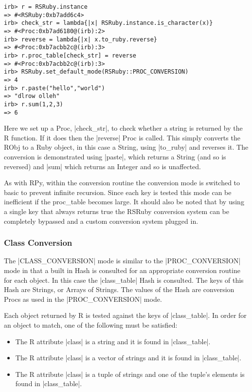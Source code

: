 \documentclass[a4paper,12pt]{book}
\begin{document}
\begin{Verbatim}
irb> r = RSRuby.instance
=> #<RSRuby:0xb7add6c4>
irb> check_str = lambda{|x| RSRuby.instance.is_character(x)}
=> #<Proc:0xb7ad6180@(irb):2>
irb> reverse = lambda{|x| x.to_ruby.reverse}
=> #<Proc:0xb7acbb2c@(irb):3>
irb> r.proc_table[check_str] = reverse
=> #<Proc:0xb7acbb2c@(irb):3>
irb> RSRuby.set_default_mode(RSRuby::PROC_CONVERSION)
=> 4
irb> r.paste("hello","world")
=> "dlrow olleh"
irb> r.sum(1,2,3)
=> 6
\end{Verbatim}

Here we set up a Proc, |check_str|, to check whether a string is returned by the R function. If it does then the |reverse| Proc is called. This simply converts the RObj to a Ruby object, in this case a String, using |to_ruby| and reverses it. The conversion is demonstrated using |paste|, which returns a String (and so is reversed) and |sum| which returns an Integer and so is unaffected.

As with RPy, within the conversion routine the conversion mode is switched to basic to prevent infinite recursion. Since each key is tested this mode can be inefficient if the proc\_table becomes large. It should also be noted that by using a single key that always returns true the RSRuby conversion system can be completely bypassed and a custom conversion system plugged in.

\subsubsection{Class Conversion}

The |CLASS_CONVERSION| mode is similar to the |PROC_CONVERSION| mode in that a built in Hash is consulted for an appropriate conversion routine for each object. In this case the |class_table| Hash is consulted. The keys of this Hash are Strings, or Arrays of Strings. The values of the Hash are conversion Procs as used in the |PROC_CONVERSION| mode.

Each object returned by R is tested against the keys of |class_table|. In order for an object to match, one of the following must be satisfied:

\begin{itemize}
\item The R attribute |class| is a string and it is found in |class_table|.
\item The R attribute |class| is a vector of strings and it is found in |class_table|.
\item The R attribute |class| is a tuple of strings and one of the tuple's elements is found in |class_table|.
\end{itemize}
\end{document}
